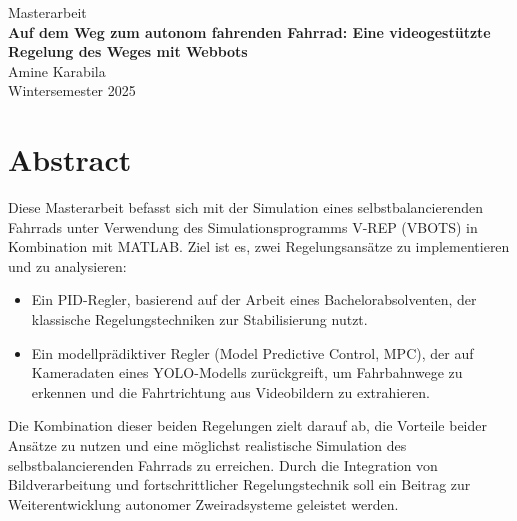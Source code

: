 \documentclass[11pt]{article}
\begin{document}
\begin{center}
\end{center}

\vspace{0.6cm}
\begin{center}
  {\LARGE Masterarbeit}\\[2.9cm]
  {\LARGE\textbf{Auf dem Weg zum autonom fahrenden Fahrrad: Eine videogestützte Regelung des Weges mit Webbots}}\\[2.9cm]
  {\LARGE Amine Karabila}\\[10.2cm]
  {\large Wintersemester 2025}
\end{center}

\vspace{0.4cm}

\newpage
\section*{Abstract}

Diese Masterarbeit befasst sich mit der Simulation eines selbstbalancierenden Fahrrads unter Verwendung des Simulationsprogramms V-REP (VBOTS) in Kombination mit MATLAB. Ziel ist es, zwei Regelungsansätze zu implementieren und zu analysieren:

\begin{itemize}
  \item Ein PID-Regler, basierend auf der Arbeit eines Bachelorabsolventen, der klassische Regelungstechniken zur Stabilisierung nutzt.
  \item Ein modellprädiktiver Regler (Model Predictive Control, MPC), der auf Kameradaten eines YOLO-Modells zurückgreift, um Fahrbahnwege zu erkennen und die Fahrtrichtung aus Videobildern zu extrahieren.
\end{itemize}

Die Kombination dieser beiden Regelungen zielt darauf ab, die Vorteile beider Ansätze zu nutzen und eine möglichst realistische Simulation des selbstbalancierenden Fahrrads zu erreichen. Durch die Integration von Bildverarbeitung und fortschrittlicher Regelungstechnik soll ein Beitrag zur Weiterentwicklung autonomer Zweiradsysteme geleistet werden.

\end{document}

